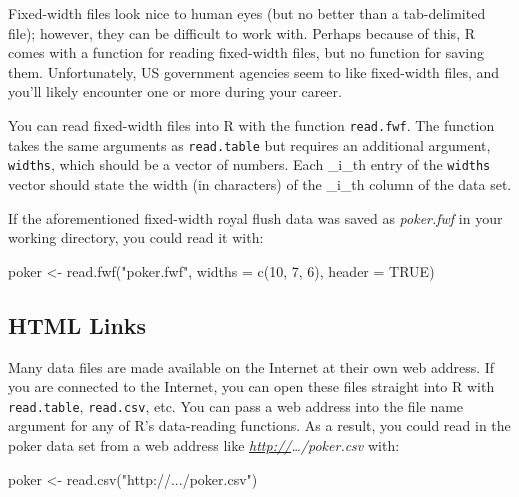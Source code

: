 \documentclass[
  letterpaper,
  DIV=11,
  numbers=noendperiod]{scrbook}
\newenvironment{Shaded}{\begin{snugshade}}{\end{snugshade}}
\newcommand{\AttributeTok}[1]{\textcolor[rgb]{0.40,0.45,0.13}{#1}}
\newcommand{\ConstantTok}[1]{\textcolor[rgb]{0.56,0.35,0.01}{#1}}
\newcommand{\DecValTok}[1]{\textcolor[rgb]{0.68,0.00,0.00}{#1}}
\newcommand{\FunctionTok}[1]{\textcolor[rgb]{0.28,0.35,0.67}{#1}}
\newcommand{\NormalTok}[1]{\textcolor[rgb]{0.00,0.23,0.31}{#1}}
\newcommand{\OtherTok}[1]{\textcolor[rgb]{0.00,0.23,0.31}{#1}}
\newcommand{\StringTok}[1]{\textcolor[rgb]{0.13,0.47,0.30}{#1}}
\begin{document}
Fixed-width files look nice to human eyes (but no better than a
tab-delimited file); however, they can be difficult to work with.
Perhaps because of this, R comes with a function for reading fixed-width
files, but no function for saving them. Unfortunately, US government
agencies seem to like fixed-width files, and you'll likely encounter one
or more during your career.

You can read fixed-width files into R with the function
\texttt{read.fwf}. The function takes the same arguments as
\texttt{read.table} but requires an additional argument,
\texttt{widths}, which should be a vector of numbers. Each \_i\_th entry
of the \texttt{widths} vector should state the width (in characters) of
the \_i\_th column of the data set.

If the aforementioned fixed-width royal flush data was saved as
\emph{poker.fwf} in your working directory, you could read it with:

\begin{Shaded}
\begin{Highlighting}[]
\NormalTok{poker }\OtherTok{\textless{}{-}} \FunctionTok{read.fwf}\NormalTok{(}\StringTok{"poker.fwf"}\NormalTok{, }\AttributeTok{widths =} \FunctionTok{c}\NormalTok{(}\DecValTok{10}\NormalTok{, }\DecValTok{7}\NormalTok{, }\DecValTok{6}\NormalTok{), }\AttributeTok{header =} \ConstantTok{TRUE}\NormalTok{)}
\end{Highlighting}
\end{Shaded}

\subsection{HTML Links}\label{html-links}

Many data files are made available on the Internet at their own web
address. If you are connected to the Internet, you can open these files
straight into R with \texttt{read.table}, \texttt{read.csv}, etc. You
can pass a web address into the file name argument for any of R's
data-reading functions. As a result, you could read in the poker data
set from a web address like
\href{http://}{\emph{http://}}\emph{\ldots/poker.csv} with:

\begin{Shaded}
\begin{Highlighting}[]
\NormalTok{poker }\OtherTok{\textless{}{-}} \FunctionTok{read.csv}\NormalTok{(}\StringTok{"http://.../poker.csv"}\NormalTok{)}
\end{Highlighting}
\end{Shaded}
\end{document}
